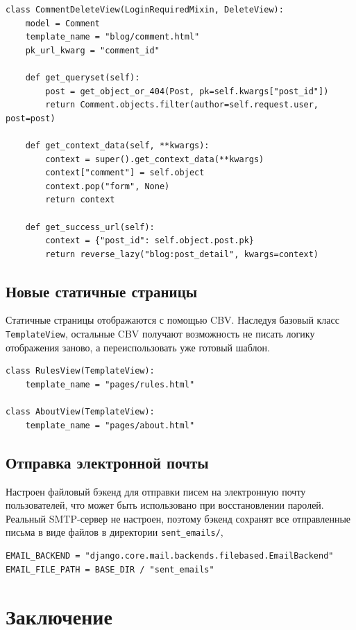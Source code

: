\documentclass[bachelor, och, pract]{../SCWorks}
\begin{document}
\begin{lstlisting}
class CommentDeleteView(LoginRequiredMixin, DeleteView):
    model = Comment
    template_name = "blog/comment.html"
    pk_url_kwarg = "comment_id"

    def get_queryset(self):
        post = get_object_or_404(Post, pk=self.kwargs["post_id"])
        return Comment.objects.filter(author=self.request.user, post=post)

    def get_context_data(self, **kwargs):
        context = super().get_context_data(**kwargs)
        context["comment"] = self.object
        context.pop("form", None)
        return context

    def get_success_url(self):
        context = {"post_id": self.object.post.pk}
        return reverse_lazy("blog:post_detail", kwargs=context)
\end{lstlisting}

\newpage
\subsection{Новые статичные страницы}

Статичные страницы отображаются с помощью CBV.
Наследуя базовый класс \texttt{TemplateView}, остальные CBV получают возможность не писать логику отображения заново, а переиспользовать уже готовый шаблон.

\begin{lstlisting}
class RulesView(TemplateView):
    template_name = "pages/rules.html"

class AboutView(TemplateView):
    template_name = "pages/about.html"
\end{lstlisting}

\subsection{Отправка электронной почты}

Настроен файловый бэкенд для отправки писем на электронную почту пользователей, что может быть использовано при восстановлении паролей.
Реальный SMTP-сервер не настроен, поэтому бэкенд сохранят все отправленные письма в виде файлов в директории \texttt{sent\_emails/},

\begin{lstlisting}
EMAIL_BACKEND = "django.core.mail.backends.filebased.EmailBackend"
EMAIL_FILE_PATH = BASE_DIR / "sent_emails"
\end{lstlisting}


\newpage
\section{Заключение}
\end{document}
